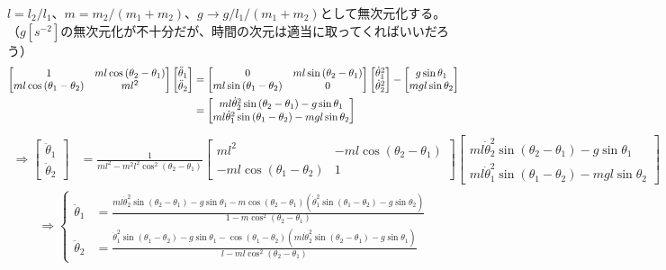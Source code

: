 \documentclass{jsarticle}
\newcommand{\eqa}[1]{\begin{align}#1\end{align}}
\newcommand{\so}{\Rightarrow}
\newcommand{\cost}[2]{\cos\left(\theta_{#1}-\theta_{#2}\right)}
\newcommand{\coste}[3]{\cos^{#3}\left(\theta_{#1}-\theta_{#2}\right)}
\newcommand{\sint}[2]{\sin\left(\theta_{#1}-\theta_{#2}\right)}
\newcommand{\dott}[1]{\dot{\theta}_{#1}}
\newcommand{\ddott}[1]{\ddot{\theta}_{#1}}
\begin{document}
$l = l_2 / l_1$、$m = m_2 / (m_1 + m_2)$、$g \rightarrow g / l_1 / (m_1 + m_2)$として無次元化する。
（$g[s^{-2}]$の無次元化が不十分だが、時間の次元は適当に取ってくればいいだろう）
\eqa{
	\begin{bmatrix}
		1 & m l \cost{2}{1} \\
		m l \cost{1}{2} & m l^2
	\end{bmatrix}
	\begin{bmatrix}
		\ddott{1} \\ \ddott{2}
	\end{bmatrix}
	&=
	\begin{bmatrix}
		0 & m l \sint{2}{1} \\
		m l \sint{1}{2} & 0
	\end{bmatrix}
	\begin{bmatrix}
		\dott{1}^2 \\ \dott{2}^2
	\end{bmatrix}
	-
	\begin{bmatrix}
		g \sin\theta_1 \\ m g l \sin\theta_2
	\end{bmatrix} \notag\\
	&=
	\begin{bmatrix}
		m l \dott{2}^2 \sint{2}{1} - g \sin\theta_1 \\
		m l \dott{1}^2 \sint{1}{2} - m g l \sin\theta_2
	\end{bmatrix} \notag
}
\eqa{
	\so
	\begin{bmatrix}
		\ddott{1} \\ \ddott{2}
	\end{bmatrix}
	&=
	\frac{1}{m l^2 - m^2 l^2 \coste{2}{1}{2}}
	\begin{bmatrix}
		m l^2 & -m l \cost{2}{1} \\
		-m l \cost{1}{2} & 1
	\end{bmatrix}
	\begin{bmatrix}
		m l \dott{2}^2 \sint{2}{1} - g \sin\theta_1 \\
		m l \dott{1}^2 \sint{1}{2} - m g l \sin\theta_2
	\end{bmatrix}
}
\eqa{
	\so
	\begin{cases}
		\ddott{1} &= \frac{m l \dott{2}^2 \sint{2}{1} - g \sin\theta_1 - m \cost{2}{1}\left(\dott{1}^2 \sint{1}{2} - g \sin\theta_2\right)}{1 - m \coste{2}{1}{2}} \\
		\ddott{2} &= \frac{\dott{1}^2 \sint{1}{2} - g \sin\theta_1 - \cost{1}{2}\left(m l \dott{2}^2 \sint{2}{1} - g \sin\theta_1\right)}{l - m l \coste{2}{1}{2}}
	\end{cases}
}
\end{document}
